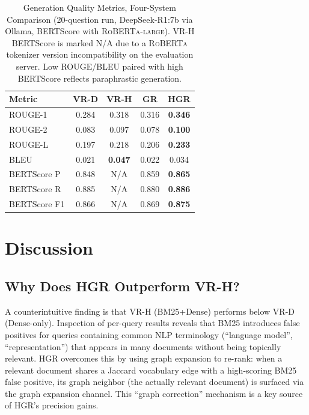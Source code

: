 \documentclass[conference,10pt,twocolumn]{IEEEtran}
\begin{document}
\begin{table}[t]
\centering
\caption{Generation Quality Metrics, Four-System Comparison (20-question run, DeepSeek-R1:7b via Ollama, BERTScore with \textsc{RoBERTa-large}). VR-H BERTScore is marked N/A due to a \textsc{RoBERTa} tokenizer version incompatibility on the evaluation server. Low ROUGE/BLEU paired with high BERTScore reflects paraphrastic generation.}
\label{tab:generation}
\begin{tabular}{lcccc}
\toprule
Metric & VR-D & VR-H & GR & HGR \\
\midrule
ROUGE-1      & 0.284 & 0.318 & 0.316 & \textbf{0.346} \\
ROUGE-2      & 0.083 & 0.097 & 0.078 & \textbf{0.100} \\
ROUGE-L      & 0.197 & 0.218 & 0.206 & \textbf{0.233} \\
BLEU         & 0.021 & \textbf{0.047} & 0.022 & 0.034 \\
BERTScore P  & 0.848 & N/A   & 0.859 & \textbf{0.865} \\
BERTScore R  & 0.885 & N/A   & 0.880 & \textbf{0.886} \\
BERTScore F1 & 0.866 & N/A   & 0.869 & \textbf{0.875} \\
\bottomrule
\end{tabular}
\end{table}

\section{Discussion}
\label{sec:discussion}

\subsection{Why Does HGR Outperform VR-H?}

A counterintuitive finding is that VR-H (BM25+Dense) performs below VR-D (Dense-only). Inspection of per-query results reveals that BM25 introduces false positives for queries containing common NLP terminology (``language model'', ``representation'') that appears in many documents without being topically relevant. HGR overcomes this by using graph expansion to re-rank: when a relevant document shares a Jaccard vocabulary edge with a high-scoring BM25 false positive, its graph neighbor (the actually relevant document) is surfaced via the graph expansion channel. This ``graph correction'' mechanism is a key source of HGR's precision gains.
\end{document}

